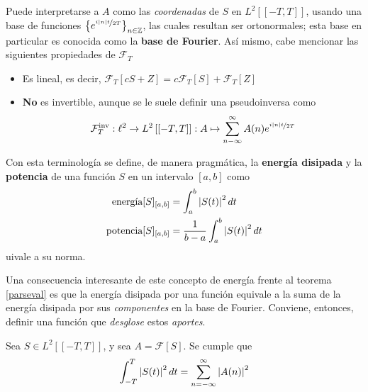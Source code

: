 Puede interpretarse a $A$ como las \textit{coordenadas} de $S$ en $L^{2}\left[[-T,T]\right]$, 
usando una base de funciones $\left\{ e^{\nicefrac{i \left| n \right| t}{2 T}} \right\}_{n\in \mathbb{Z}}$, las
cuales resultan ser ortonormales; esta base en particular es conocida como la \textbf{base de 
Fourier}.
Así mismo, cabe mencionar las siguientes 
propiedades de $\mathcal{F}_T$
\begin{itemize}
\item Es lineal, es decir, $\mathcal{F}_T[cS + Z] = c\mathcal{F}_T[S] + \mathcal{F}_T[Z]$

\item \textbf{No} es invertible, aunque se le suele definir una
pseudoinversa
como
\begin{equation*}
\mathcal{F}_{T}^{\text{inv}} : \ell^{2} \rightarrow L^{2}\left[[-T,T]\right] :
A \mapsto \sum_{n -\infty}^{\infty} A(n) e^{\nicefrac{i \left| n \right| t}{2 T}}
\end{equation*}
\end{itemize}

Con esta terminología se define, de manera pragmática, la \textbf{energía disipada} y la 
\textbf{potencia} de una función $S$ en un intervalo $[a,b]$ como 
\begin{align*}
\text{energía}[S]_{[a,b]} &= \int_a^{b} \left| S(t) \right|^{2} dt \\
\text{potencia}[S]_{[a,b]} &= \frac{1}{b-a} \int_a^{b} \left| S(t) \right|^{2} dt
\end{align*}
%
uivale a su norma.

Una consecuencia interesante de este concepto de energía frente al teorema \ref{parseval} es que la 
energía disipada por una función equivale a la suma de la energía disipada por sus 
\textit{componentes} en la base de Fourier.
Conviene, entonces, definir una función que \textit{desglose} estos \textit{aportes}.

\begin{teorema}[Parseval]
Sea $S \in L^{2}\left[[-T,T]\right]$, y sea $A = \mathcal{F}[S]$. Se cumple que
\begin{equation*}
\int_{-T}^{T} \left| S(t) \right|^{2} dt = \sum_{n=-\infty}^{\infty} \left| A(n) \right|^{2}
\end{equation*}
\label{parseval}
\end{teorema}

